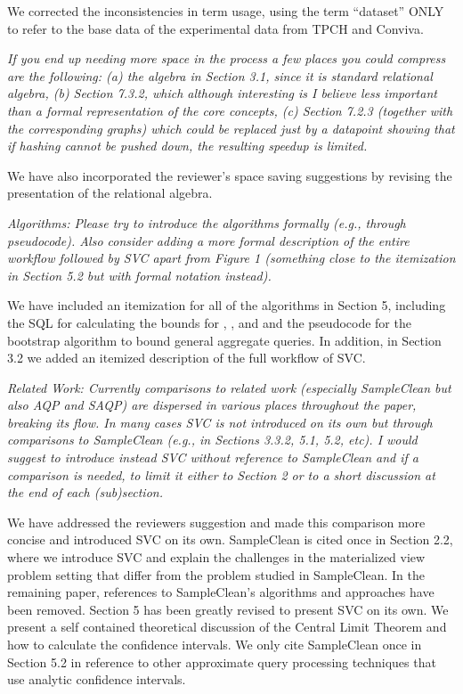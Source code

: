 We corrected the inconsistencies in term usage, using the term “dataset” ONLY to refer to the base data of the experimental data from TPCH and Conviva. 

\vspace{1em}
\emph{If you end up needing more space in the process a few places you could compress are the following: (a) the algebra in Section 3.1, since it is standard relational algebra, (b) Section 7.3.2, which although interesting is I believe less important than a formal representation of the core concepts, (c) Section 7.2.3 (together with the corresponding graphs) which could be replaced just by a datapoint showing that if hashing cannot be pushed down, the resulting speedup is limited.}

We have also incorporated the reviewer’s space saving suggestions by revising the presentation of the relational algebra.

\vspace{1em}
\emph{Algorithms: Please try to introduce the algorithms formally (e.g., through pseudocode). Also consider adding a more formal description of the entire workflow followed by SVC apart from Figure 1 (something close to the itemization in Section 5.2 but with formal notation instead).}

We have included an itemization for all of the algorithms in Section 5, including the SQL for calculating the bounds for \sumfunc, \avgfunc, and \countfunc and the pseudocode for the bootstrap algorithm to bound general aggregate queries. In addition, in Section 3.2 we added an itemized description of the full workflow of SVC.

\vspace{1em}
\emph{Related Work: Currently comparisons to related work (especially SampleClean but also AQP and SAQP) are dispersed in various places throughout the paper, breaking its flow. In many cases SVC is not introduced on its own but through comparisons to SampleClean (e.g., in Sections 3.3.2, 5.1, 5.2, etc). I would suggest to introduce instead SVC without reference to SampleClean and if a comparison is needed, to limit it either to Section 2 or to a short discussion at the end of each (sub)section.}

We have addressed the reviewers suggestion and made this comparison more concise and introduced SVC on its own. SampleClean is cited once in Section 2.2, where we introduce SVC and explain the challenges in the materialized view problem setting that differ from the problem studied in SampleClean. In the remaining paper, references to SampleClean’s algorithms and approaches have been removed. Section 5 has been greatly revised to present SVC on its own. We present a self contained theoretical discussion of the Central Limit Theorem and how to calculate the confidence intervals. We only cite SampleClean once in Section 5.2 in reference to other approximate query processing techniques that use analytic confidence intervals.

